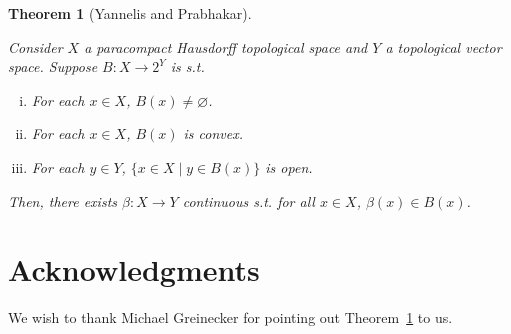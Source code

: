 \documentclass[11pt]{article}
\theoremstyle{definition}
\theoremstyle{plain}
\newtheorem{theorem}{Theorem}%
\begin{document}
\begin{samepage}
\begin{theorem} [Yannelis and Prabhakar]
\label{thm:selection}

Consider $X$ a paracompact Hausdorff topological space and $Y$ a topological vector space. Suppose $B: X \rightarrow 2^Y$ is s.t.

\begin{enumerate}[i.]

\item For each $x \in X$, $B(x) \ne \varnothing$.
\item For each $x \in X$, $B(x)$ is convex.
\item For each $y \in Y$, $\{x \in X \mid y \in B(x)\}$ is open.

\end{enumerate}

Then, there exists $\beta: X \rightarrow Y$ continuous s.t. for all $x \in X$, $\beta(x) \in B(x)$.

\end{theorem}
\end{samepage}

\section*{Acknowledgments}

We wish to thank Michael Greinecker for pointing out Theorem~\ref{thm:selection} to us.



\end{document}
